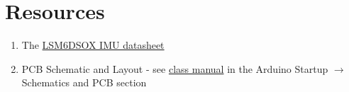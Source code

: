 \section{Resources}\label{sec:imuresources}
\begin{enumerate}
    \item The \href{https://www.st.com/resource/en/datasheet/lsm6dsox.pdf}{LSM6DSOX IMU datasheet}
    \item PCB Schematic and Layout - see 
            \href{https://github.com/semcneil/Fundamentals-of-Microcontrollers-Manual}{class manual} 
            in the Arduino Startup $\rightarrow$ Schematics and PCB section
\end{enumerate}

